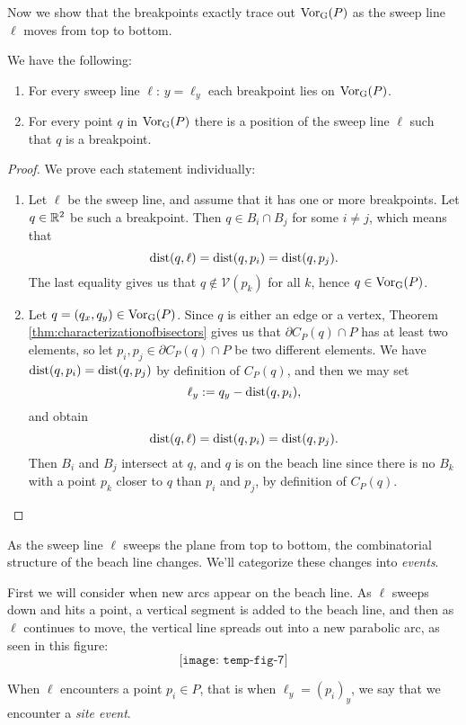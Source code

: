 Now we show that the breakpoints exactly trace out $\operatorname{Vor_{G}}(P)$ as the sweep line $\ell$ moves from top to bottom.
\begin{prop}
We have the following:
\begin{enumerate}[{(}i{)}]
\item For every sweep line $\ell$: $y = \ell_y$ each breakpoint lies on $\operatorname{Vor_{G}}(P)$.
\item For every point $q$ in $\operatorname{Vor_{G}}(P)$ there is a position of the sweep line $\ell$ such that $q$ is a breakpoint.
\end{enumerate}
\end{prop}
\begin{proof}
We prove each statement individually:
\begin{enumerate}[{(}i{):}]
    \item Let $\ell$ be the sweep line, and assume that it has one or more breakpoints. Let $q \in \mathbb{R}^2$ be such a breakpoint. Then $q \in B_i \cap B_j$ for some $i \ne j$, which means that
    \[
        \operatorname{dist}(q, \ell) = \operatorname{dist}(q, p_i) = \operatorname{dist}(q, p_j).
    \]
    The last equality gives us that $q \not\in \mathcal{V}(p_k)$ for all $k$, hence $q \in \operatorname{Vor_{G}}(P)$.
    \item Let $q = (q_x, q_y) \in \operatorname{Vor_{G}}(P)$. Since $q$ is either an edge or a vertex, Theorem \ref{thm:characterizationofbisectors} gives us that $\partial C_P(q) \cap P$ has at least two elements, so let $p_i, p_j \in \partial C_P(q) \cap P$ be two different elements. We have $\operatorname{dist}(q, p_i) = \operatorname{dist}(q, p_j)$ by definition of $C_P(q)$, and then we may set
    \[
        \ell_y := q_y - \operatorname{dist}(q, p_i),
    \]
    and obtain
    \[
        \operatorname{dist}(q, \ell) = \operatorname{dist}(q, p_i) = \operatorname{dist}(q, p_j).
    \]
    Then $B_i$ and $B_j$ intersect at $q$, and $q$ is on the beach line since there is no $B_k$ with a point $p_k$ closer to $q$ than $p_i$ and $p_j$, by definition of $C_P(q)$.
\end{enumerate}
\end{proof}
As the sweep line $\ell$ sweeps the plane from top to bottom, the combinatorial structure of the beach line changes. We'll categorize these changes into \emph{events}.

First we will consider when new arcs appear on the beach line. As $\ell$ sweeps down and hits a point, a vertical segment is added to the beach line, and then as $\ell$ continues to move, the vertical line spreads out into a new parabolic arc, as seen in this figure:
\[
    \texttt{[image: temp-fig-7]}
\]
\begin{defn}
When $\ell$ encounters a point $p_i \in P$, that is when $\ell_y = (p_i)_y$, we say that we encounter a \emph{site event}.
\end{defn}

